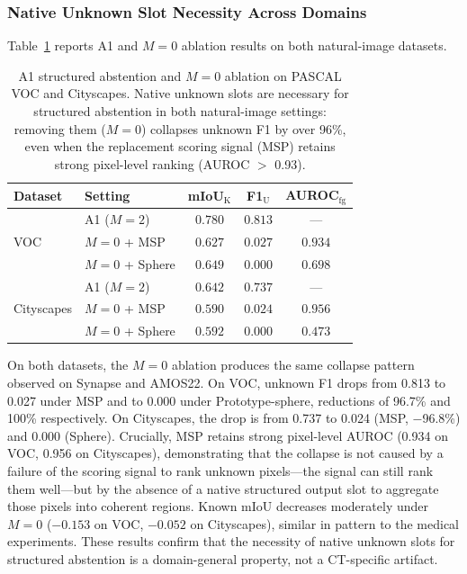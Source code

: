 \documentclass[3p,twocolumn,authoryear]{elsarticle}
\begin{document}
\subsubsection{Native Unknown Slot Necessity Across Domains}\label{sec:exp:crossdomain:m0}

Table~\ref{tab:crossdomain_m0} reports A1 and $M{=}0$ ablation results on both
natural-image datasets.

\begin{table}[!t]
\centering
\caption{A1 structured abstention and $M{=}0$ ablation on PASCAL VOC and Cityscapes.
Native unknown slots are necessary for structured abstention in both natural-image
settings: removing them ($M{=}0$) collapses unknown F1 by over 96\%, even when the
replacement scoring signal (MSP) retains strong pixel-level ranking (AUROC $>$ 0.93).}
\label{tab:crossdomain_m0}
\footnotesize
\begin{tabular}{ll ccc}
\toprule
Dataset & Setting & mIoU$_{\text{K}}$ & F1$_{\text{U}}$ & AUROC$_{\text{fg}}$ \\
\midrule
\multirow{3}{*}{VOC}
  & A1 ($M{=}2$)       & $0.780$ & $0.813$ & --- \\
  & $M{=}0$ + MSP      & $0.627$ & $0.027$ & $0.934$ \\
  & $M{=}0$ + Sphere   & $0.649$ & $0.000$ & $0.698$ \\
\midrule
\multirow{3}{*}{Cityscapes}
  & A1 ($M{=}2$)       & $0.642$ & $0.737$ & --- \\
  & $M{=}0$ + MSP      & $0.590$ & $0.024$ & $0.956$ \\
  & $M{=}0$ + Sphere   & $0.592$ & $0.000$ & $0.473$ \\
\bottomrule
\end{tabular}
\end{table}

On both datasets, the $M{=}0$ ablation produces the same collapse pattern observed
on Synapse and AMOS22.
On VOC, unknown F1 drops from 0.813 to 0.027 under MSP and to 0.000 under
Prototype-sphere, reductions of 96.7\% and 100\% respectively.
On Cityscapes, the drop is from 0.737 to 0.024 (MSP, $-$96.8\%) and 0.000 (Sphere).
Crucially, MSP retains strong pixel-level AUROC (0.934 on VOC, 0.956 on Cityscapes),
demonstrating that the collapse is not caused by a failure of the scoring signal to
rank unknown pixels---the signal can still rank them well---but by the absence of a
native structured output slot to aggregate those pixels into coherent regions.
Known mIoU decreases moderately under $M{=}0$ ($-0.153$ on VOC, $-0.052$ on
Cityscapes), similar in pattern to the medical experiments.
These results confirm that the necessity of native unknown slots for structured
abstention is a domain-general property, not a CT-specific artifact.
\end{document}
